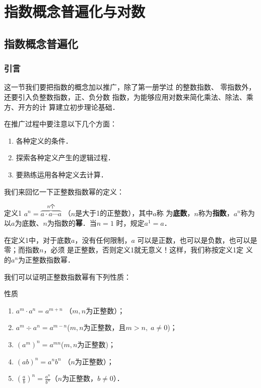\chapter{指数概念普遍化与对数}

\section{指数概念普遍化}
\subsection{引言}
这一节我们要把指数的概念加以推广，除了第一册学过
的整数指数、
零指数外，还要引入负整数指数，正、负分数
指数，为能够应用对数来简化乘法、除法、乘方、开方的计
算建立初步理论基础．

在推广过程中要注意以下几个方面：
\begin{enumerate}
\item 各种定义的条件．
\item 探索各种定义产生的逻辑过程．
\item 要熟练运用各种定义去计算．
\end{enumerate}


我们来回忆一下正整数指数幂的定义：

\begin{blk}{定义1}
$a^n=\overbrace{a\cdot a\cdots a}^{\text{$n$个}}$ （$n$是大于1的正整数），其中$a$称
为\textbf{底数}，$n$称为\textbf{指数}，$a^n$称为以$a$为底数、$n$为指数的\textbf{幂}．当$n=1$
时，规定$a^1=a$．
\end{blk}

在定义1中，对于底数$a$，没有任何限制，$a$
可以是正数，也可以是负数，也可以是零；而指数$n$，必须
是正整数，否则定义1就无意义！这样，我们称按定义1定
义的$a^n$为正整数指数幂．

我们可以证明正整数指数幂有下列性质：
\begin{blk}{性质}
\begin{enumerate}
    \item $a^m\cdot a^n=a^{m+n}$ \quad （$m,n$为正整数）；
    \item $a^m\div a^n=a^{m-n}$\quad ($m,n$为正整数，且$m>n,\; a\ne 0$)；
    \item $(a^m)^n=a^{mn}$\quad ($m,n$为正整数)；
    \item $(ab)^n=a^nb^n$ \quad（$n$为正整数）；
    \item $\left(\frac{a}{b}\right)^n=\frac{a^n}{b^n}$\quad （$n$为正整数，$b\ne 0$）．
\end{enumerate}
\end{blk}

